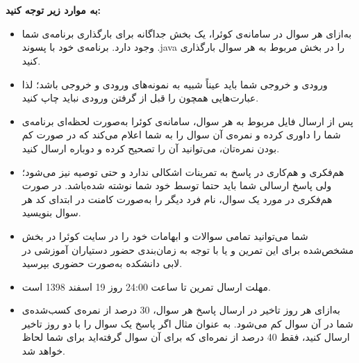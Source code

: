 \documentclass[]{article}
\begin{document}
\newpage
\pagestyle{fancy}
\fancyhf{}
\fancyfoot{}
\cfoot{\thepage}




 \Large \textbf{\\\\
به موارد زیر توجه کنید:}

\begin{itemize}[label=$\ast$]
\item به‌ازای هر سوال در سامانه‌ی کوئرا، یک بخش جداگانه برای بارگذاری برنامه‌ی شما وجود دارد. برنامه‌ی خود با پسوند .java را در بخش مربوط به هر سوال بارگذاری کنید.
\item ورودی و خروجی شما باید عیناً شبیه به نمونه‌های ورودی و خروجی باشد؛ لذا عبارت‌هایی همچون  را قبل از گرفتن ورودی نباید چاپ کنید.
\item پس از ارسال فایل مربوط به هر سوال، سامانه‌ی کوئرا به‌صورت لحظه‌ای برنامه‌ی شما را داوری کرده و نمره‌ی آن سوال را به شما اعلام می‌کند که در صورت کم بودن نمره‌تان، می‌توانید آن را تصحیح کرده و دوباره ارسال کنید.
\item هم‌فکری و هم‌کاری در پاسخ به تمرینات اشکالی ندارد و حتی توصیه نیز می‌شود؛ ولی پاسخ ارسالی شما باید حتما توسط خود شما نوشته شده‌باشد. در صورت هم‌فکری در مورد یک سوال، نام فرد دیگر را به‌صورت کامنت در ابتدای کد هر سوال بنویسید.
\item شما می‌توانید تمامی سوالات و ابهامات خود را در سایت کوئرا در بخش مشخص‌شده برای این تمرین و یا با توجه به زمان‌بندی حضور دستیاران آموزشی در لابی دانشکده به‌صورت حضوری بپرسید.
\item مهلت ارسال تمرین تا ساعت 24:00 روز 19 اسفند 1398 است.
\item به‌ازای هر روز تاخیر در ارسال پاسخ هر سوال، 30 درصد از نمره‌ی کسب‌شده‌ی شما در آن سوال کم می‌شود. به عنوان مثال اگر پاسخ یک سوال را با دو روز تاخیر ارسال کنید، فقط 40 درصد از نمره‌ای که برای آن سوال گرفته‌اید برای شما لحاظ خواهد شد.
\end{itemize}



\newpage
\end{document}
